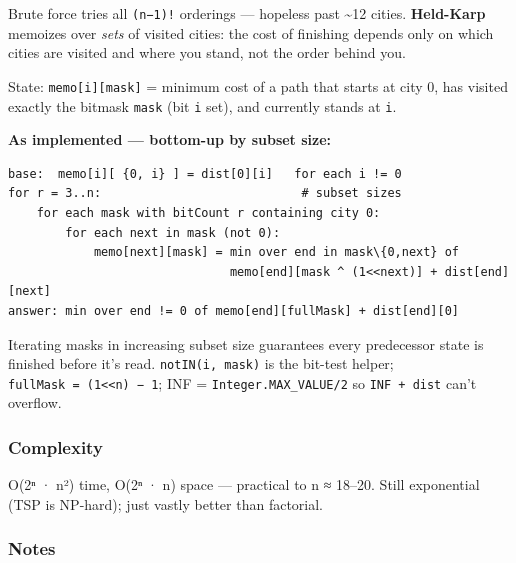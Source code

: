 \documentclass[
  10pt,
  letterpaper,
  onecolumn]{article}
\begin{document}
Brute force tries all \texttt{(n−1)!} orderings --- hopeless past
\textasciitilde12 cities. \textbf{Held-Karp} memoizes over \emph{sets}
of visited cities: the cost of finishing depends only on which cities
are visited and where you stand, not the order behind you.

State: \texttt{memo{[}i{]}{[}mask{]}} = minimum cost of a path that
starts at city 0, has visited exactly the bitmask \texttt{mask} (bit
\texttt{i} set), and currently stands at \texttt{i}.

\textbf{As implemented --- bottom-up by subset size:}

\begin{verbatim}
base:  memo[i][ {0, i} ] = dist[0][i]   for each i != 0
for r = 3..n:                            # subset sizes
    for each mask with bitCount r containing city 0:
        for each next in mask (not 0):
            memo[next][mask] = min over end in mask\{0,next} of
                               memo[end][mask ^ (1<<next)] + dist[end][next]
answer: min over end != 0 of memo[end][fullMask] + dist[end][0]
\end{verbatim}

Iterating masks in increasing subset size guarantees every predecessor
state is finished before it's read. \texttt{notIN(i,\ mask)} is the
bit-test helper; \texttt{fullMask\ =\ (1\textless{}\textless{}n)\ −\ 1};
INF = \texttt{Integer.MAX\_VALUE/2} so \texttt{INF\ +\ dist} can't
overflow.

\hypertarget{complexity-18}{%
\subsubsection{Complexity}\label{complexity-18}}

O(2ⁿ · n²) time, O(2ⁿ · n) space --- practical to n ≈ 18--20. Still
exponential (TSP is NP-hard); just vastly better than factorial.

\hypertarget{notes-16}{%
\subsubsection{Notes}\label{notes-16}}
\end{document}
